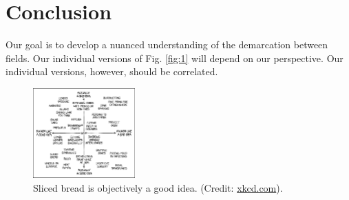\documentclass[12pt]{article}
\begin{document}
\section{Conclusion}

Our goal is to develop a nuanced understanding of the demarcation between fields.  Our individual versions of Fig. \ref{fig:1} will depend on our perspective.  Our individual versions, however, should be correlated.

\begin{figure}[hb]
\centering
\includegraphics[width=0.35\textwidth]{figures/good_and_bad_ideas.png}
\caption{\label{fig:2} Sliced bread is objectively a good idea. (Credit: \url{xkcd.com}).}
\end{figure}
\end{document}
